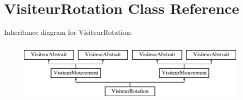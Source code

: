\hypertarget{class_visiteur_rotation}{\section{Visiteur\-Rotation Class Reference}
\label{class_visiteur_rotation}
}
Inheritance diagram for Visiteur\-Rotation\-:\begin{figure}[H]
\begin{center}
\leavevmode
\includegraphics[height=3.000000cm]{class_visiteur_rotation}
\end{center}
\end{figure}
